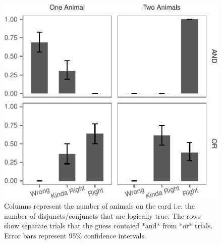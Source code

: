 \documentclass[10pt, letterpaper]{article}
\newenvironment{CodeChunk}{}{}
\begin{document}
\begin{CodeChunk}
\begin{figure}[t]

{\centering \includegraphics{figs/plot-1} 

}

\caption[Columns represent the number of animals on the card i.e]{Columns represent the number of animals on the card i.e. the number of disjuncts/conjuncts that are logically true. The rows show separate trials that the guess contaied *and* from *or* trials. Error bars represent 95\% confidence intervals.}\label{fig:plot}
\end{figure}
\end{CodeChunk}
\end{document}
